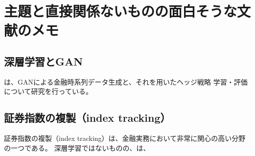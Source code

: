 \documentclass[autodetect-engine, dvipdfmx-if-dvi, ja=standard]{ltjsarticle}
\begin{document}
\section{主題と直接関係ないものの面白そうな文献のメモ}
\subsection{深層学習とGAN}

\cite{wiese2019deep}は、GANによる金融時系列データ生成と、それを用いたヘッジ戦略
学習・評価について研究を行っている。

\subsection{証券指数の複製（index tracking）}
証券指数の複製（index tracking）は、金融実務において非常に関心の高い分野の一つである。
深層学習ではないものの、\cite{gendreau2019cvar}は、

 

\end{document}
